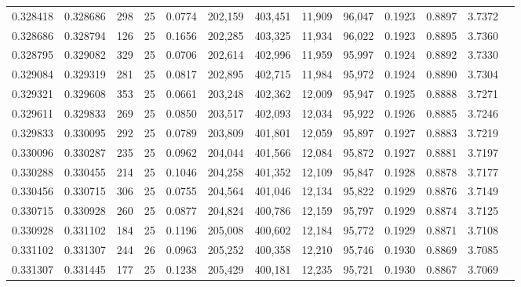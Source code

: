 \begin{tabular}{rrrrrrrrrrrrr}
0.328418 & 0.328686 &   298 &  25 &                                     0.0774 & 202,159 & 403,451 &  11,909 &  96,047 & 0.1923 & 0.8897 & 3.7372 \\
0.328686 & 0.328794 &   126 &  25 &                                     0.1656 & 202,285 & 403,325 &  11,934 &  96,022 & 0.1923 & 0.8895 & 3.7360 \\
0.328795 & 0.329082 &   329 &  25 &                                     0.0706 & 202,614 & 402,996 &  11,959 &  95,997 & 0.1924 & 0.8892 & 3.7330 \\
0.329084 & 0.329319 &   281 &  25 &                                     0.0817 & 202,895 & 402,715 &  11,984 &  95,972 & 0.1924 & 0.8890 & 3.7304 \\
0.329321 & 0.329608 &   353 &  25 &                                     0.0661 & 203,248 & 402,362 &  12,009 &  95,947 & 0.1925 & 0.8888 & 3.7271 \\
0.329611 & 0.329833 &   269 &  25 &                                     0.0850 & 203,517 & 402,093 &  12,034 &  95,922 & 0.1926 & 0.8885 & 3.7246 \\
0.329833 & 0.330095 &   292 &  25 &                                     0.0789 & 203,809 & 401,801 &  12,059 &  95,897 & 0.1927 & 0.8883 & 3.7219 \\
0.330096 & 0.330287 &   235 &  25 &                                     0.0962 & 204,044 & 401,566 &  12,084 &  95,872 & 0.1927 & 0.8881 & 3.7197 \\
0.330288 & 0.330455 &   214 &  25 &                                     0.1046 & 204,258 & 401,352 &  12,109 &  95,847 & 0.1928 & 0.8878 & 3.7177 \\
0.330456 & 0.330715 &   306 &  25 &                                     0.0755 & 204,564 & 401,046 &  12,134 &  95,822 & 0.1929 & 0.8876 & 3.7149 \\
0.330715 & 0.330928 &   260 &  25 &                                     0.0877 & 204,824 & 400,786 &  12,159 &  95,797 & 0.1929 & 0.8874 & 3.7125 \\
0.330928 & 0.331102 &   184 &  25 &                                     0.1196 & 205,008 & 400,602 &  12,184 &  95,772 & 0.1929 & 0.8871 & 3.7108 \\
0.331102 & 0.331307 &   244 &  26 &                                     0.0963 & 205,252 & 400,358 &  12,210 &  95,746 & 0.1930 & 0.8869 & 3.7085 \\
0.331307 & 0.331445 &   177 &  25 &                                     0.1238 & 205,429 & 400,181 &  12,235 &  95,721 & 0.1930 & 0.8867 & 3.7069 \\

\end{tabular}
